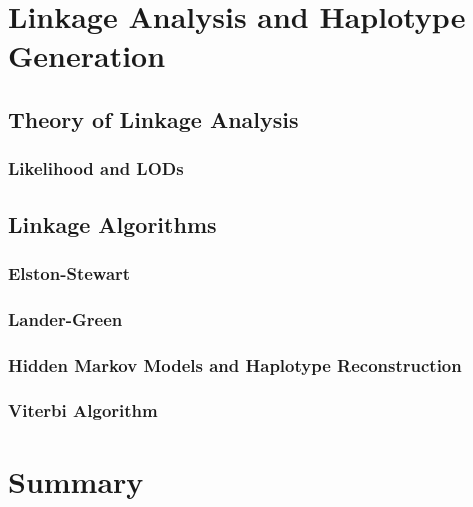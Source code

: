 \section{Linkage Analysis and Haplotype Generation}

\subsection{Theory of Linkage Analysis}

\subsubsection{Likelihood and LODs}

\subsection{Linkage Algorithms}
\subsubsection{Elston-Stewart}
\subsubsection{Lander-Green}
\subsubsection{Hidden Markov Models and Haplotype Reconstruction}
\subsubsection{Viterbi Algorithm}

\section{Summary}
